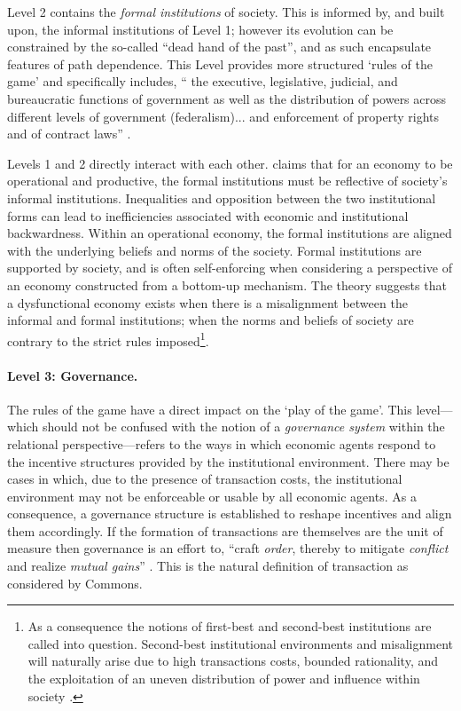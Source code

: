Level 2 contains the \emph{formal institutions} of society. This is informed by, and built upon, the informal institutions of Level 1; however its evolution can be constrained by the so-called ``dead hand of the past'', and as such encapsulate features of path dependence. This Level provides more structured `rules of the game' and specifically includes, `` the executive, legislative, judicial, and bureaucratic functions of government as well as the distribution of powers across different levels of government (federalism)... and enforcement of property rights and of contract laws'' \citep[p.~589]{Williamson2000}.

Levels 1 and 2 directly interact with each other. \citet[p.~5]{Sautet2005} claims that for an economy to be operational and productive, the formal institutions must be reflective of society's informal institutions. Inequalities and opposition between the two institutional forms can lead to inefficiencies associated with economic and institutional backwardness. Within an operational economy, the formal institutions are aligned with the underlying beliefs and norms of the society. Formal institutions are supported by society, and is often self-enforcing when considering a perspective of an economy constructed from a bottom-up mechanism. The theory suggests that a dysfunctional economy exists when there is a misalignment between the informal and formal institutions; when the norms and beliefs of society are contrary to the strict rules imposed\footnote{As a consequence the notions of first-best and second-best institutions \citep{Rodrik2008} are called into question. Second-best institutional environments and misalignment will naturally arise due to high transactions costs, bounded rationality, and the exploitation of an uneven distribution of power and influence within society \citep{DouhanHenrekson2010}.}.

\paragraph{Level 3: Governance.}

The rules of the game have a direct impact on the `play of the game'. This level---which should not be confused with the notion of a \emph{governance system} within the relational perspective---refers to the ways in which economic agents respond to the incentive structures provided by the institutional environment. There may be cases in which, due to the presence of transaction costs, the institutional environment may not be enforceable or usable by all economic agents. As a consequence, a governance structure is established to reshape incentives and align them accordingly. If the formation of transactions are themselves are the unit of measure then governance is an effort to, ``craft \emph{order}, thereby to mitigate \emph{conflict} and realize \emph{mutual gains}'' \citep[p.~599]{Williamson2000}. This is the natural definition of transaction as considered by Commons.

